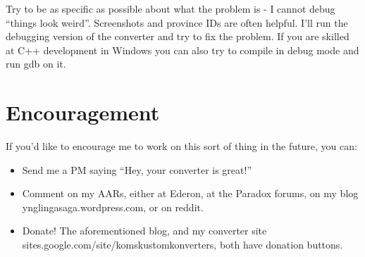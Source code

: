 \documentclass[12pt,ebook,oneside]{book}
\begin{document}
Try to be as specific as possible about what the problem is - I cannot debug
``things look weird''. Screenshots and province IDs are often
helpful. I'll run the debugging version of the converter and try to fix the
problem. If you are skilled at C++ development in Windows you can also
try to compile in debug mode and run gdb on it. 

\section{Encouragement}

If you'd like to encourage me to work on this sort of thing in the
future, you can:
\begin{itemize}
\item Send me a PM saying ``Hey, your converter is great!'' 
\item Comment on my AARs, either at Ederon, at the Paradox forums, on
  my blog ynglingasaga.wordpress.com, or on reddit.
\item Donate! The aforementioned blog, and my converter site
  sites.google.com/site/komskustomkonverters, both have donation
  buttons.
\end{itemize}
\end{document}
